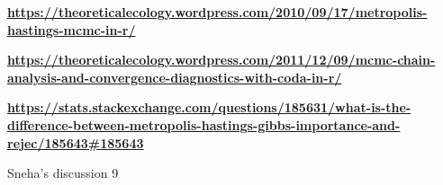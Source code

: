 \documentclass[11pt,a4paper]{article}
\begin{document}
\begin{thebibliography}{9}
\href{https://theoreticalecology.wordpress.com/2010/09/17/metropolis-hastings-mcmc-in-r/}{\textbf{https://theoreticalecology.wordpress.com/2010/09/17/metropolis-hastings-mcmc-in-r/}}


\href{https://theoreticalecology.wordpress.com/2011/12/09/mcmc-chain-analysis-and-convergence-diagnostics-with-coda-in-r/}{\textbf{https://theoreticalecology.wordpress.com/2011/12/09/mcmc-chain-analysis-and-convergence-diagnostics-with-coda-in-r/}}

 
\href{https://stats.stackexchange.com/questions/185631/what-is-the-difference-between-metropolis-hastings-gibbs-importance-and-rejec/185643\#185643}{\textbf{https://stats.stackexchange.com/questions/185631/what-is-the-difference-between-metropolis-hastings-gibbs-importance-and-rejec/185643\#185643}}


Sneha’s discussion 9

\end{thebibliography}
\end{document}
